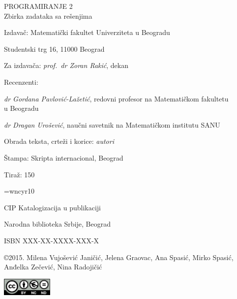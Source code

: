 \noindent
PROGRAMIRANJE 2\\
Zbirka zadataka sa rešenjima
\vspace*{3mm}


\noindent
Izdava\v{c}: Matematički fakultet Univerziteta u Beogradu

Studentski trg 16, 11000 Beograd

\noindent
Za izdava\v{c}a: {\slshape prof.~dr Zoran Rakić}, dekan
\vspace*{3mm}

\noindent
Recenzenti:

\noindent
{\slshape dr Gordana Pavlović-Lažetić}, redovni profesor na Matematičkom fakultetu\\ u Beogradu

\noindent
{\slshape dr Dragan Urošević}, naučni savetnik na Matematičkom institutu SANU
\vspace*{3mm}

\noindent
Obrada teksta, crteži i korice: {\slshape autori}


\ifstampanaverzija
\noindent
Štampa: Skripta internacional, Beograd 

\noindent
Tiraž: 150
\vspace*{3mm}


\font\cyr=wncyr10

\noindent
CIP {\cyr Katalogizacija u publikaciji} 

\noindent
{\cyr Narodna biblioteka Srbije, Beograd}
\vspace*{1mm}

\else 
  \noindent ISBN XXX-XX-XXXX-XXX-X \vspace*{1cm}
\fi



\noindent
\copyright 2015. Milena Vujošević Janičić, Jelena Graovac, Ana Spasić, Mirko Spasić, Anđelka Zečević, Nina Radojičić



\vspace*{1mm}
\noindent\includegraphics[width=2.5cm]{cc.png}

\newpage
